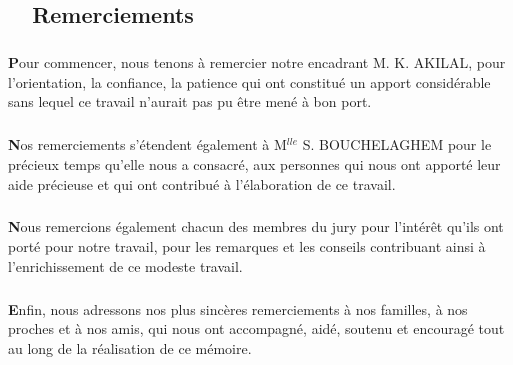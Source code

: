 \begin{titlepage}
\newpage
\pagestyle{fancy}      
\lhead{}  
\chead{}     
\rhead{}     
    
\renewcommand{\headrulewidth}{0.5pt}

\chapter*{\hrulefill ~~\textbf{Remerciements}~ \hrulefill}
\paragraph{}
\paragraph{}
\large

	  \textbf{P}our commencer, nous tenons \`a remercier notre encadrant M. K. AKILAL, pour l'orientation, la confiance, la patience qui ont constitu\'e un apport consid\'erable sans lequel ce travail n'aurait pas pu \^etre men\'e \`a bon port. 
		
		\paragraph{}
			
		\textbf{N}os remerciements s'\'etendent \'egalement \`a M$^{lle}$ S. BOUCHELAGHEM pour le précieux temps qu'elle nous a consacr\'e, aux personnes qui nous ont apport\'e leur aide pr\'ecieuse et qui ont contribu\'e \`a l'\'elaboration de ce travail.
		
		\paragraph{}
		
		\textbf{N}ous remercions \'egalement chacun des membres du jury pour l'int\'er\^et qu'ils ont port\'e pour notre travail, pour les remarques et les conseils contribuant ainsi \`a l'enrichissement de ce modeste travail.
		
		\paragraph{}
		\textbf{E}nfin, nous adressons nos plus sinc\`eres remerciements \`a nos familles, \`a nos proches et \`a nos amis, qui nous ont accompagn\'e, aid\'e, soutenu et encourag\'e tout au long de la r\'ealisation de ce m\'emoire. 
		
		\paragraph{}
		
		
		
		\paragraph{}
		


\thispagestyle{empty}		

\end{titlepage}	